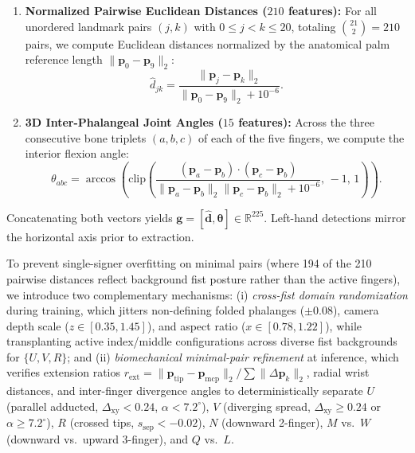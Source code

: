 \documentclass[12pt,a4paper]{article}
\begin{document}
\begin{enumerate}
    \item \textbf{Normalized Pairwise Euclidean Distances ($210$ features):} For all unordered landmark pairs $(j, k)$ with $0 \le j < k \le 20$, totaling $\binom{21}{2} = 210$ pairs, we compute Euclidean distances normalized by the anatomical palm reference length $\|\mathbf{p}_0 - \mathbf{p}_9\|_2$:
    \begin{equation}
        \hat{d}_{jk} = \frac{\|\mathbf{p}_j - \mathbf{p}_k\|_2}{\|\mathbf{p}_0 - \mathbf{p}_9\|_2 + 10^{-6}}.
        \label{eq:dist}
    \end{equation}

    \item \textbf{3D Inter-Phalangeal Joint Angles ($15$ features):} Across the three consecutive bone triplets $(a, b, c)$ of each of the five fingers, we compute the interior flexion angle:
    \begin{equation}
        \theta_{abc} = \arccos\!\left(\text{clip}\!\left(\frac{(\mathbf{p}_a - \mathbf{p}_b) \cdot (\mathbf{p}_c - \mathbf{p}_b)}{\|\mathbf{p}_a - \mathbf{p}_b\|_2 \|\mathbf{p}_c - \mathbf{p}_b\|_2 + 10^{-6}},\, -1,\, 1\right)\right).
        \label{eq:angle}
    \end{equation}
\end{enumerate}

Concatenating both vectors yields $\mathbf{g} = [\hat{\mathbf{d}}, \boldsymbol{\theta}] \in \mathbb{R}^{225}$. Left-hand detections mirror the horizontal axis prior to extraction.

To prevent single-signer overfitting on minimal pairs (where 194 of the 210 pairwise distances reflect background fist posture rather than the active fingers), we introduce two complementary mechanisms:
(i) \textit{cross-fist domain randomization} during training, which jitters non-defining folded phalanges ($\pm 0.08$), camera depth scale ($z \in [0.35, 1.45]$), and aspect ratio ($x \in [0.78, 1.22]$), while transplanting active index/middle configurations across diverse fist backgrounds for $\{\textit{U}, \textit{V}, \textit{R}\}$; and
(ii) \textit{biomechanical minimal-pair refinement} at inference, which verifies extension ratios $r_{\text{ext}} = \|\mathbf{p}_{\text{tip}} - \mathbf{p}_{\text{mcp}}\|_2 / \sum \|\Delta \mathbf{p}_k\|_2$, radial wrist distances, and inter-finger divergence angles to deterministically separate $\textit{U}$ (parallel adducted, $\Delta_{\text{xy}} < 0.24$, $\alpha < 7.2^\circ$), $\textit{V}$ (diverging spread, $\Delta_{\text{xy}} \ge 0.24$ or $\alpha \ge 7.2^\circ$), $\textit{R}$ (crossed tips, $s_{\text{sep}} < -0.02$), $\textit{N}$ (downward 2-finger), $\textit{M}$ vs.\ $\textit{W}$ (downward vs.\ upward 3-finger), and $\textit{Q}$ vs.\ $\textit{L}$.
\end{document}
